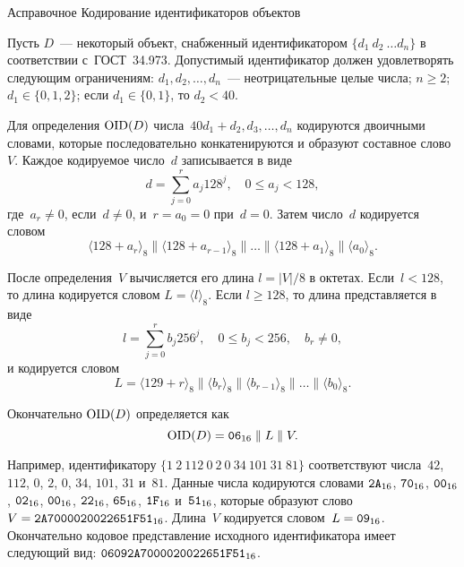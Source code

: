\begin{appendix}{А}{справочное}
{Кодирование идентификаторов объектов}
\label{BER}

\mbox{}

Пусть $D$~--- некоторый объект, 
снабженный идентификатором $\{d_1\ d_2\ \ldots d_n\}$
в соответствии с~ГОСТ~34.973.
%
Допустимый идентификатор должен удовлетворять следующим ограничениям:
$d_1,d_2,\ldots,d_n$~--- неотрицательные целые числа;
$n\geq 2$; $d_1\in\{0,1,2\}$;
если $d_1\in\{0,1\}$, то $d_2<40$.

Для определения $\text{\normalfont OID}(D)$ числа~$40 d_1 + d_2,d_3,\ldots,d_n$ 
кодируются двоичными словами,
которые последовательно конкатенируются и образуют составное слово~$V$.
%
Каждое кодируемое число~$d$ записывается в виде 
$$
d=\sum_{j=0}^{r}a_j 128^j,\quad
0\leq a_j<128,
$$
где~$a_r\neq 0$, если~$d\neq 0$, и~$r=a_0=0$ при~$d=0$.
%
Затем число~$d$ кодируется словом
$$
\langle 128+a_r \rangle_8\parallel
\langle 128+a_{r-1} \rangle_8\parallel
\ldots\parallel
\langle 128+a_1 \rangle_8\parallel
\langle a_0 \rangle_8.
$$

После определения~$V$ вычисляется его длина $l=|V|/8$ в октетах.  
%
Если~$l<128$, то длина кодируется словом $L=\langle l\rangle_{8}$.
Если $l\geq 128$, то длина представляется в виде
$$
l=\sum_{j=0}^r b_j 256^j,\quad
0\leq b_j<256,\quad
b_r\neq 0,
$$
и кодируется словом 
$$
L=\langle 129+r\rangle_8\parallel
\langle b_r\rangle_8\parallel
\langle b_{r-1}\rangle_8\parallel\ldots\parallel
\langle b_0\rangle_8.
$$

Окончательно $\text{\normalfont OID}(D)$ определяется как
$$
\text{\normalfont OID}(D)=\texttt{06}_{16}\parallel L\parallel V.
$$

Например, идентификатору $\{1\ 2\ 112\ 0\ 2\ 0\ 34\ 101\ 31\ 81\}$
соответствуют числа~$42$, 
$112$, 
$0$, 
$2$, 
$0$, 
$34$, 
$101$, 
$31$ 
и~$81$.
Данные числа кодируются словами 
$\texttt{2A}_{16}$, 
$\texttt{70}_{16}$, 
$\texttt{00}_{16}$,
$\texttt{02}_{16}$,
$\texttt{00}_{16}$,
$\texttt{22}_{16}$,
$\texttt{65}_{16}$,
$\texttt{1F}_{16}$
и~$\texttt{51}_{16}$,
которые образуют слово~$V=\texttt{2A7000020022651F51}_{16}$.
Длина~$V$ кодируется словом~$L=\texttt{09}_{16}$.
Окончательно кодовое представление
исходного идентификатора имеет следующий вид: 
$\texttt{06092A7000020022651F51}_{16}$.

\end{appendix}

